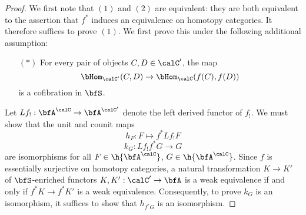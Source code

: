 \begin{Simplicial Categories}


\begin{proof}
We first note that $(1)$ and $(2)$ are equivalent: they are both equivalent to the assertion that
$f^{\ast}$ induces an equivalence on homotopy categories. It therefore suffices to prove $(1)$.
We first prove this under the following additional assumption:
\begin{itemize}
\item[$(\ast)$] For every pair of objects $C, D \in \calC'$, the map
$$ \bHom_{\calC'}( C,D) \rightarrow \bHom_{\calC}( f(C), f(D) )$$
is a cofibration in $\bfS$.
\end{itemize}
Let $Lf_{!}: \bfA^{\calC} \rightarrow \bfA^{\calC'}$ denote the left derived functor of $f_{!}$. We must show that the unit and counit maps
$$ h_F: F \mapsto f^{\ast} Lf_{!} F $$
$$ k_G: Lf_{!} f^{\ast} G \rightarrow G$$
are isomorphisms for all $F \in \h{\bfA^{\calC}}$, $G \in \h{\bfA^{\calC}}$. Since $f$ is essentially surjective on homotopy categories, a natural transformation $K \rightarrow K'$ of $\bfS$-enriched functors $K,K': \calC' \rightarrow \bfA$ is a weak equivalence if and only if $f^{\ast} K \rightarrow f^{\ast} K'$ is a weak equivalence. Consequently, to prove $k_G$ is an isomorphism, it suffices to show that
$h_{f^{\ast} G}$ is an isomorphism. 


\end{proof}
\end{Simplicial Categories}
